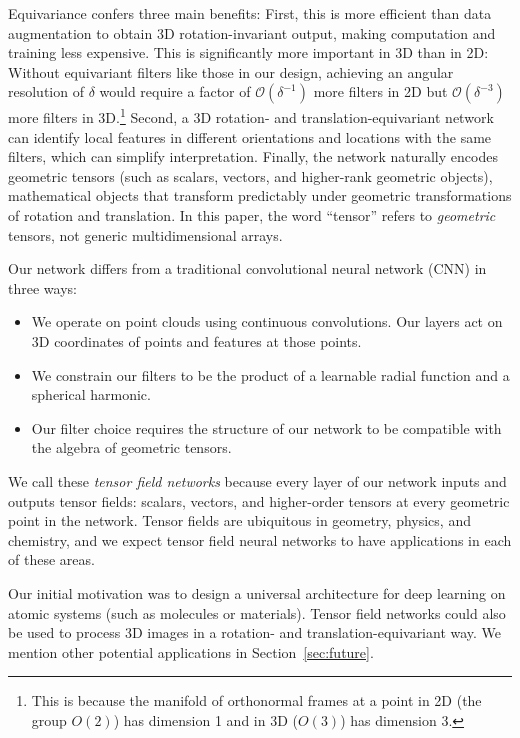 \documentclass{article}
\begin{document}
Equivariance confers three main benefits:
First, this is more efficient than data augmentation to obtain 3D rotation-invariant output, making computation and training less expensive. This is significantly more important in 3D than in 2D: Without equivariant filters like those in our design, achieving an angular resolution of $\delta$ would require a factor of $\mathcal{O}(\delta^{-1})$ more filters in 2D but $\mathcal{O}(\delta^{-3})$ more filters in 3D.\footnote{This is because the manifold of orthonormal frames at a point in 2D (the group $O(2)$) has dimension 1 and in 3D ($O(3)$) has dimension 3.} Second, a 3D rotation- and translation-equivariant network can identify local features in different orientations and locations with the same filters, which can simplify interpretation. Finally, the network naturally encodes geometric tensors (such as scalars, vectors, and higher-rank geometric objects), mathematical objects that transform predictably under geometric transformations of rotation and translation.  In this paper, the word ``tensor'' refers to {\em geometric} tensors, %
not generic multidimensional arrays.

Our network differs from a traditional convolutional neural network (CNN) in three ways:
\begin{itemize}
\item We operate on point clouds using continuous convolutions. 
Our layers act on 3D coordinates of points and features at those points.
\item We constrain our filters to be the product of a learnable radial function and a spherical harmonic. 
\item Our filter choice requires the structure of our network to be compatible with the algebra of geometric tensors.
\end{itemize}
We call these {\em tensor field networks} because every layer of our network inputs and outputs tensor fields: scalars, vectors, and higher-order tensors at every geometric point in the network. Tensor fields are ubiquitous in geometry, physics, and chemistry, and we expect tensor field neural networks to have applications in each of these areas.

Our initial motivation was to design a universal architecture for deep learning on atomic systems (such as molecules or materials). Tensor field networks could also be used to process 3D images in a rotation- and translation-equivariant way.  We mention other potential applications in Section~\ref{sec:future}.
% 
% 
% 
\end{document}
